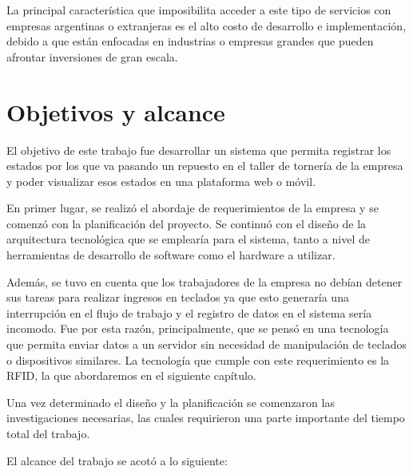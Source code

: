 La principal característica que imposibilita acceder a este tipo de servicios con empresas argentinas o extranjeras es el alto costo de desarrollo e implementación, debido a que están enfocadas en industrias o empresas grandes que pueden afrontar inversiones de gran escala.



\section{Objetivos y alcance}

El objetivo de este trabajo fue desarrollar un sistema que permita registrar los estados por los que va pasando un repuesto en el taller de tornería de la empresa y poder visualizar esos estados en una plataforma web o móvil. 

En primer lugar, se realizó el abordaje de requerimientos de la empresa y se comenzó con la planificación del proyecto. Se continuó con el diseño de la arquitectura tecnológica que se emplearía para el sistema, tanto a nivel de herramientas de desarrollo de software como el hardware a utilizar.

Además, se tuvo en cuenta que los trabajadores de la empresa no debían detener sus tareas para realizar ingresos en teclados ya que esto generaría una interrupción en el flujo de trabajo y el registro de datos en el sistema sería incomodo. Fue por esta razón, principalmente, que se pensó en una tecnología que permita enviar datos a un servidor sin necesidad de manipulación de teclados o dispositivos similares. La tecnología que cumple con este requerimiento es la RFID, la que abordaremos en el siguiente capítulo.

Una vez determinado el diseño y la planificación se comenzaron las investigaciones necesarias, las cuales requirieron una parte importante del tiempo total del trabajo.

El alcance del trabajo se acotó a lo siguiente:

